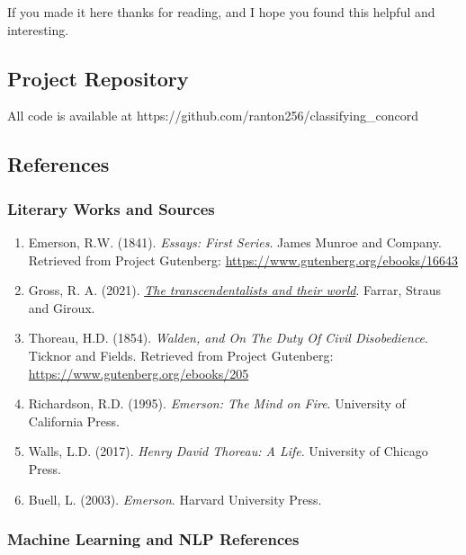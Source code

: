\documentclass[
]{article}
\begin{document}
If you made it here thanks for reading, and I hope you found this helpful and interesting.

\subsection{Project Repository}\label{project-repository}

All code is available at https://github.com/ranton256/classifying\_concord

\subsection{References}\label{references}

\subsubsection{Literary Works and
Sources}\label{literary-works-and-sources}

\begin{enumerate}
\def\labelenumi{\arabic{enumi}.}
\item
  Emerson, R.W. (1841). \emph{Essays: First Series}. James Munroe and
  Company. Retrieved from Project Gutenberg:
  \url{https://www.gutenberg.org/ebooks/16643}
\item
  Gross, R. A. (2021).
  \href{https://us.macmillan.com/books/9780374279325/thetranscendentalistsandtheirworld/}{\emph{The
  transcendentalists and their world}}. Farrar, Straus and Giroux.
\item
  Thoreau, H.D. (1854). \emph{Walden, and On The Duty Of Civil
  Disobedience}. Ticknor and Fields. Retrieved from Project Gutenberg:
  \url{https://www.gutenberg.org/ebooks/205}
\item
  Richardson, R.D. (1995). \emph{Emerson: The Mind on Fire}. University
  of California Press.
\item
  Walls, L.D. (2017). \emph{Henry David Thoreau: A Life}. University of
  Chicago Press.
\item
  Buell, L. (2003). \emph{Emerson}. Harvard University Press.
\end{enumerate}

\subsubsection{Machine Learning and NLP
References}\label{machine-learning-and-nlp-references}
\end{document}
